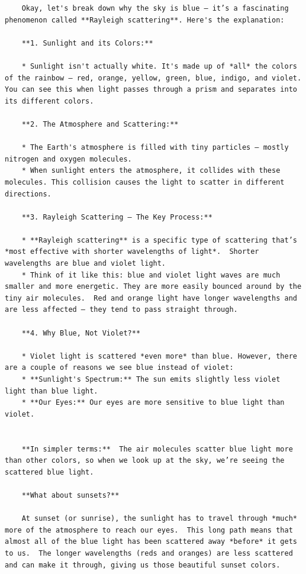\begin{verbatim}
    Okay, let's break down why the sky is blue – it’s a fascinating phenomenon called **Rayleigh scattering**. Here's the explanation:
    
    **1. Sunlight and its Colors:**
    
    * Sunlight isn't actually white. It's made up of *all* the colors of the rainbow – red, orange, yellow, green, blue, indigo, and violet.  You can see this when light passes through a prism and separates into its different colors.
    
    **2. The Atmosphere and Scattering:**
    
    * The Earth's atmosphere is filled with tiny particles – mostly nitrogen and oxygen molecules.
    * When sunlight enters the atmosphere, it collides with these molecules. This collision causes the light to scatter in different directions.
    
    **3. Rayleigh Scattering – The Key Process:**
    
    * **Rayleigh scattering** is a specific type of scattering that’s *most effective with shorter wavelengths of light*.  Shorter wavelengths are blue and violet light.
    * Think of it like this: blue and violet light waves are much smaller and more energetic. They are more easily bounced around by the tiny air molecules.  Red and orange light have longer wavelengths and are less affected – they tend to pass straight through.
    
    **4. Why Blue, Not Violet?**
    
    * Violet light is scattered *even more* than blue. However, there are a couple of reasons we see blue instead of violet:
    * **Sunlight's Spectrum:** The sun emits slightly less violet light than blue light.
    * **Our Eyes:** Our eyes are more sensitive to blue light than violet.
    
    
    **In simpler terms:**  The air molecules scatter blue light more than other colors, so when we look up at the sky, we’re seeing the scattered blue light.
    
    **What about sunsets?**
    
    At sunset (or sunrise), the sunlight has to travel through *much* more of the atmosphere to reach our eyes.  This long path means that almost all of the blue light has been scattered away *before* it gets to us.  The longer wavelengths (reds and oranges) are less scattered and can make it through, giving us those beautiful sunset colors.
    

\end{verbatim}
